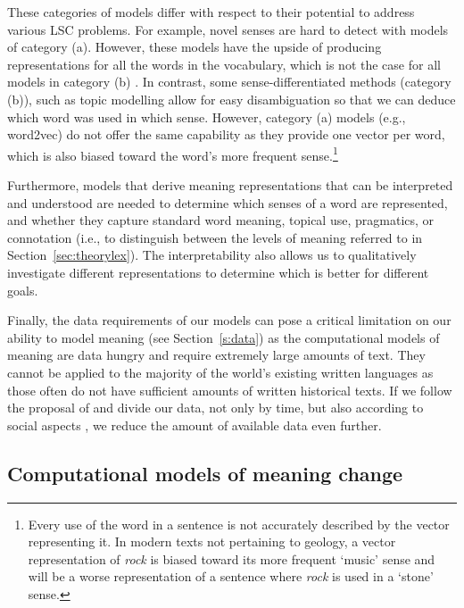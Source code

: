 \documentclass[output=paper]{langscibook}
\begin{document}
These categories of models differ with respect to their potential to address various LSC problems. For example, novel senses are hard to detect with models of category (a). However, these models have the upside of producing representations for all the words in the vocabulary, which is not the case for all models in category (b)  \citep[see for example][]{tahmasebi2013applicability}.  
In contrast, some sense-differentiated methods (category (b)), such as topic modelling allow for easy disambiguation so that we can deduce which word was used in which sense. However, category (a) models (e.g., word2vec) 
do not offer the same capability as they provide one vector per word, which is also biased toward the word's more frequent sense.\footnote{Every use of the word in a sentence is not accurately described by the vector representing it. In modern texts not pertaining to geology, a vector representation of \textit{rock} is biased toward its more frequent `music' sense and will be a worse representation of a sentence where \textit{rock} is used in a `stone' sense.}

Furthermore, models that derive meaning representations that can be interpreted and understood are needed to determine which senses of a word are represented, and whether they capture standard word meaning, topical use, pragmatics, or connotation (i.e., to distinguish between the levels of meaning referred to in Section~\ref{sec:theorylex}). The interpretability also allows us to qualitatively investigate different representations to determine which is better for different goals. 
 
Finally, the data requirements of our models can pose a critical limitation on our ability to model meaning (see Section~\ref{s:data}) as the computational models of meaning are data hungry and require extremely large amounts of text. They cannot be applied to the majority of the world's existing written languages as those often do not have sufficient amounts of written historical texts. If we follow the proposal of \citet{bowern2019semantic} and divide our data, not only by time, but also according to social aspects  \citep[to e.g. echo][]{meillet1905}, we reduce the amount of available data even further.
 
\subsection{Computational models of meaning change}
\end{document}
